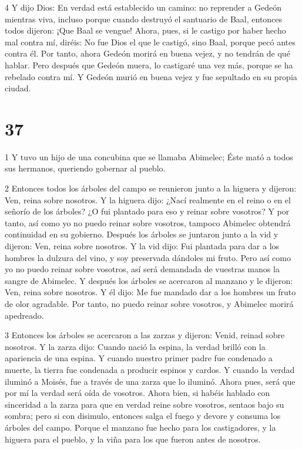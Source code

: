 \par 4 Y dijo Dios: En verdad está establecido un camino: no reprender a Gedeón mientras viva, incluso porque cuando destruyó el santuario de Baal, entonces todos dijeron: ¡Que Baal se vengue! Ahora, pues, si le castigo por haber hecho mal contra mí, diréis: No fue Dios el que le castigó, sino Baal, porque pecó antes contra él. Por tanto, ahora Gedeón morirá en buena vejez, y no tendrán de qué hablar. Pero después que Gedeón muera, lo castigaré una vez más, porque se ha rebelado contra mí. Y Gedeón murió en buena vejez y fue sepultado en su propia ciudad.



\chapter{37}

\par 1 Y tuvo un hijo de una concubina que se llamaba Abimelec; Éste mató a todos sus hermanos, queriendo gobernar al pueblo.

\par [Se ha perdido una hoja.]

\par 2 Entonces todos los árboles del campo se reunieron junto a la higuera y dijeron: Ven, reina sobre nosotros. Y la higuera dijo: ¿Nací realmente en el reino o en el señorío de los árboles? ¿O fui plantado para eso y reinar sobre vosotros? Y por tanto, así como yo no puedo reinar sobre vosotros, tampoco Abimelec obtendrá continuidad en su gobierno. Después los árboles se juntaron junto a la vid y dijeron: Ven, reina sobre nosotros. Y la vid dijo: Fui plantada para dar a los hombres la dulzura del vino, y soy preservada dándoles mi fruto. Pero así como yo no puedo reinar sobre vosotros, así será demandada de vuestras manos la sangre de Abimelec. Y después los árboles se acercaron al manzano y le dijeron: Ven, reina sobre nosotros. Y él dijo: Me fue mandado dar a los hombres un fruto de olor agradable. Por tanto, no puedo reinar sobre vosotros, y Abimelec morirá apedreado.

\par 3 Entonces los árboles se acercaron a las zarzas y dijeron: Venid, reinad sobre nosotros. Y la zarza dijo: Cuando nació la espina, la verdad brilló con la apariencia de una espina. Y cuando nuestro primer padre fue condenado a muerte, la tierra fue condenada a producir espinos y cardos. Y cuando la verdad iluminó a Moisés, fue a través de una zarza que lo iluminó. Ahora pues, será que por mí la verdad será oída de vosotros. Ahora bien, si habéis hablado con sinceridad a la zarza para que en verdad reine sobre vosotros, sentaos bajo su sombra; pero si con disimulo, entonces salga el fuego y devore y consuma los árboles del campo. Porque el manzano fue hecho para los castigadores, y la higuera para el pueblo, y la viña para los que fueron antes de nosotros.

